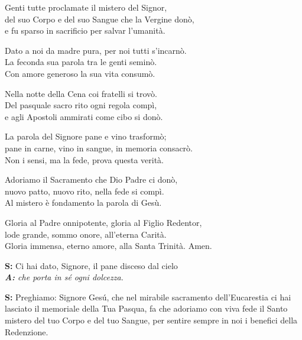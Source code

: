 
\vspace{0.25em}


\setcounter{numstrofa}{0}

\strofa Genti tutte proclamate il mistero del Signor,\\
del suo Corpo e del suo Sangue che la Vergine donò,\\
e fu sparso in sacrificio per salvar l'umanità.

\spazio

\strofa Dato a noi da madre pura, per noi tutti s'incarnò.\\
La feconda sua parola tra le genti seminò.\\
Con amore generoso la sua vita consumò.

\spazio

\strofa Nella notte della Cena coi fratelli si trovò.\\
Del pasquale sacro rito ogni regola compì,\\
e agli Apostoli ammirati come cibo si donò.

\spazio

\strofa La parola del Signore pane e vino trasformò;\\
pane in carne, vino in sangue, in memoria consacrò.\\
Non i sensi, ma la fede, prova questa verità.

\spazio

\strofa Adoriamo il Sacramento che Dio Padre ci donò,\\
nuovo patto, nuovo rito, nella fede si compì.\\
Al mistero è fondamento la parola di Gesù.

\spazio

\strofa Gloria al Padre onnipotente, gloria al Figlio Redentor,\\
lode grande, sommo onore, all'eterna Carità.\\
Gloria immensa, eterno amore, alla Santa Trinità. Amen.

\medskip

\textbf{S:} Ci hai dato, Signore, il pane disceso dal cielo\\
\emph{\textbf{A:} che porta in sé ogni dolcezza.}

\medskip

\textbf{S:} Preghiamo: Signore Gesú, che nel mirabile sacramento dell'Eucarestia ci hai lasciato il memoriale della Tua Pasqua, fa che adoriamo con viva fede il Santo mistero del tuo Corpo e del tuo Sangue, per sentire sempre in noi i benefici della Redenzione.

